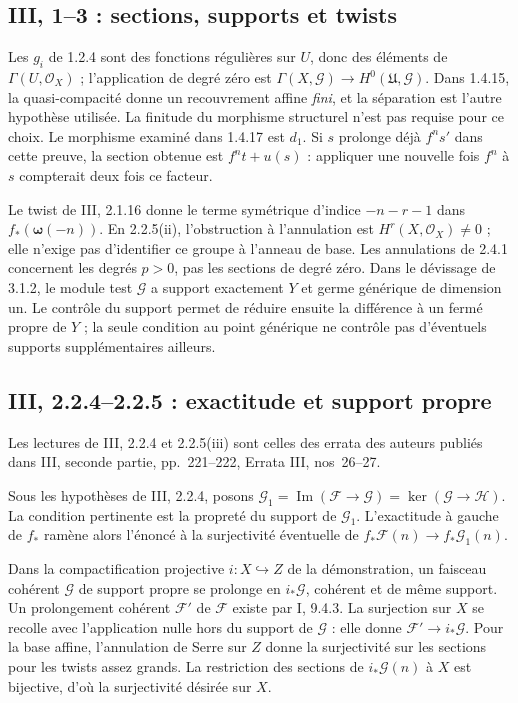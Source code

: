 \documentclass[11pt,a4paper]{article}
\begin{document}
\subsection{III, 1--3 : sections, supports et twists}
\label{note:base3-sections}
Les $g_i$ de 1.2.4 sont des fonctions régulières sur $U$,
donc des éléments de $\Gamma(U,\mathcal O_X)$ ; l'application
de degré zéro est $\Gamma(X,\mathcal G)\to H^0(\mathfrak U,\mathcal G)$.
Dans 1.4.15, la quasi-compacité donne un recouvrement affine
\emph{fini}, et la séparation est l'autre hypothèse utilisée.
La finitude du morphisme structurel n'est pas requise pour ce choix.
Le morphisme examiné dans 1.4.17 est $d_1$.
Si $s$ prolonge déjà $f^ns'$ dans cette preuve, la section
obtenue est $f^nt+u(s)$ : appliquer une nouvelle fois $f^n$
à $s$ compterait deux fois ce facteur.

Le twist de III, 2.1.16 donne le terme symétrique d'indice
$-n-r-1$ dans $f_*(\boldsymbol\omega(-n))$.
En 2.2.5(ii), l'obstruction à l'annulation est
$H^r(X,\mathcal O_X)\ne0$ ; elle n'exige pas d'identifier
ce groupe à l'anneau de base. Les annulations de 2.4.1
concernent les degrés $p>0$, pas les sections de degré zéro.
Dans le dévissage de 3.1.2, le module test $\mathcal G$ a
support exactement $Y$ et germe générique de dimension un.
Le contrôle du support permet de réduire ensuite la différence
à un fermé propre de $Y$ ; la seule condition au point générique
ne contrôle pas d'éventuels supports supplémentaires ailleurs.

\subsection{III, 2.2.4--2.2.5 : exactitude et support propre}
\label{note:base3-propersupport}
Les lectures de III, 2.2.4 et 2.2.5(iii) sont celles des
errata des auteurs publiés dans III, seconde partie, pp.~221--222,
Errata III, nos~26--27.

Sous les hypothèses de III, 2.2.4, posons
$\mathcal G_1=\operatorname{Im}(\mathcal F\to\mathcal G)
=\ker(\mathcal G\to\mathcal H)$.
La condition pertinente est la propreté du support de
$\mathcal G_1$. L'exactitude à gauche de $f_*$ ramène alors
l'énoncé à la surjectivité éventuelle de
$f_*\mathcal F(n)\to f_*\mathcal G_1(n)$.

Dans la compactification projective $i:X\hookrightarrow Z$
de la démonstration, un faisceau cohérent $\mathcal G$ de
support propre se prolonge en $i_*\mathcal G$, cohérent et
de même support. Un prolongement cohérent $\mathcal F'$ de
$\mathcal F$ existe par I, 9.4.3. La surjection sur $X$
se recolle avec l'application nulle hors du support de
$\mathcal G$ : elle donne $\mathcal F'\to i_*\mathcal G$.
Pour la base affine, l'annulation de Serre sur $Z$ donne
la surjectivité sur les sections pour les twists assez grands.
La restriction des sections de $i_*\mathcal G(n)$ à $X$
est bijective, d'où la surjectivité désirée sur $X$.
\end{document}

